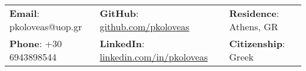 %
\vspace{0.5cm} 
\begin{center}
    \begin{tabular}{lll}
        \textbf{Email}: pkoloveas@uop.gr      &
        \hspace{0.55in} \textbf{GitHub}: \href{https://github.com/pariskoloveas}{github.com/pkoloveas}   & 
        \hspace{0.4in} 	\textbf{Residence}: Athens, GR \\

        \textbf{Phone}: +30 6943898544   & 
        \hspace{0.55in} \textbf{LinkedIn}: \href{https://www.linkedin.com/in/pkoloveas/}{linkedin.com/in/pkoloveas}    &
        \hspace{0.4in} \textbf{Citizenship}: Greek 
    \end{tabular}
\end{center}